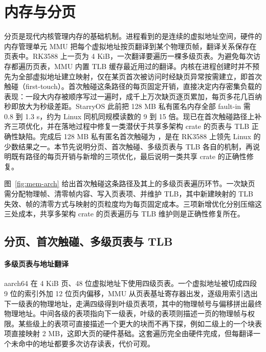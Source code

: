 \section{内存与分页}

分页是现代内核管理内存的基础机制。进程看到的是连续的虚拟地址空间，硬件的内存管理单元 MMU 把每个虚拟地址按页翻译到某个物理页帧，翻译关系保存在页表中。RK3588 上一页为 4 KiB，一次翻译要遍历一棵多级页表。为避免每次访存都遍历页表，MMU 内置 TLB 缓存最近用过的翻译。内核在进程创建时并不预先为全部虚拟地址建立映射，仅在某页首次被访问时经缺页异常按需建立，即首次触碰（first-touch）。首次触碰这条路径的每页固定开销，直接决定内存密集负载的表现：一段大内存被顺序写过一遍时，成千上万次缺页逐页累加，每页多花几百纳秒即放大为秒级差距。StarryOS 此前把 128 MB 私有匿名内存全部 fault-in 需 0.8 到 1.3 s，约为 Linux 同机同规模读数的 9 到 15 倍。现已在首次触碰路径上补齐三项优化，并在落地过程中修复一类潜伏于共享多架构 crate 的页表与 TLB 正确性缺陷。完成后 128 MB 私有匿名首次触碰为 ，是在 RK3588 上领先 Linux 的少数结果之一。本节先说明分页、首次触碰、多级页表与 TLB 各自的机制，再说明既有路径的每页开销与新增的三项优化，最后说明一类共享 crate 的正确性修复。


图~\ref{fig:mem-arch} 给出首次触碰这条路径及其上的多级页表遍历环节。一次缺页需分配物理帧、清零帧内容、写入页表项、并维护 TLB，其中新建映射的 TLB 失效、帧的清零方式与映射的页粒度均为每页固定成本。三项新增优化分别压缩这三处成本，共享多架构 crate 的页表遍历与 TLB 维护则是正确性修复所在。

\subsection{分页、首次触碰、多级页表与 TLB}

\paragraph{多级页表与地址翻译}
aarch64 在 4 KiB 页、48 位虚拟地址下使用四级页表。一个虚拟地址被切成四段 9 位的索引外加 12 位页内偏移，MMU 从页表基址寄存器出发，逐级用索引选出下一级表的物理地址，走满四级得到叶级页表项，其中的物理帧号与偏移拼出最终物理地址。中间各级的表项指向下一级表，叶级的表项则描述一页的物理帧与权限。某些级上的表项可直接描述一个更大的块而不再下探，例如二级上的一个块表项直接映射 2 MB，这即大页的硬件基础。这套遍历完全由硬件完成，但每翻译一个未命中的地址都要多次访存读表，代价可观。

